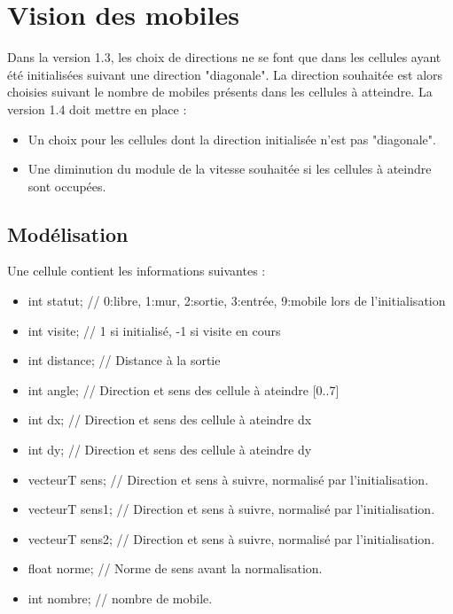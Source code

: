 %
\section{Vision des mobiles}
%
Dans la version 1.3, les choix de directions ne se font que dans les cellules ayant été initialisées suivant une direction "diagonale". La direction souhaitée est alors choisies suivant le nombre de mobiles présents dans les cellules à atteindre.
La version 1.4 doit mettre en place :
\begin{itemize}[leftmargin=2cm]
\item Un choix pour les cellules dont la direction initialisée n'est pas "diagonale".
\item Une diminution du module de la vitesse souhaitée si les cellules à ateindre sont occupées.
\end{itemize}
%
 
%
\subsection{Modélisation}
%
Une cellule contient les informations suivantes :
\begin{itemize}[leftmargin=2cm]
\item int statut;		// 0:libre, 1:mur, 2:sortie, 3:entrée, 9:mobile lors de l'initialisation
\item int visite;		// 1 si initialisé, -1 si visite en cours
\item int distance;	// Distance à la sortie
\item int angle;	// Direction et sens des cellule à ateindre [0..7]
\item int dx;		// Direction et sens des cellule à ateindre dx
\item int dy;		// Direction et sens des cellule à ateindre dy
\item vecteurT sens;	// Direction et sens à suivre, normalisé par l'initialisation.
\item vecteurT sens1;	// Direction et sens à suivre, normalisé par l'initialisation.
\item vecteurT sens2;	// Direction et sens à suivre, normalisé par l'initialisation.
\item float norme;	// Norme de sens avant la normalisation.
\item int nombre;	// nombre de mobile.
\end{itemize}
%
